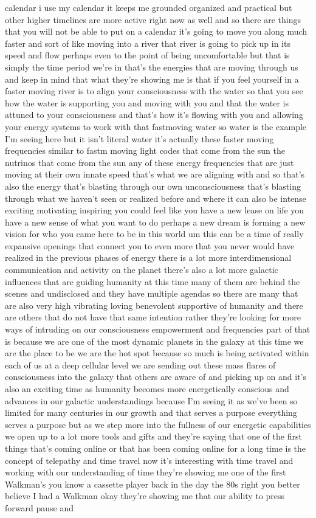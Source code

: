 \documentclass{article}
\begin{document}
calendar i use my calendar it keeps me grounded organized and practical but other higher timelines are more active right now as well and so there are things that you will not be able to put on a calendar it's going to move you along much faster and sort of like moving into a river that river is going to pick up in its speed and flow perhaps even to the point of being uncomfortable but that is simply the time period we're in that's the energies that are moving through us and keep in mind that what they're showing me is that if you feel yourself in a faster moving river is to align your consciousness with the water so that you see how the water is supporting you and moving with you and that the water is attuned to your consciousness and that's how it's flowing with you and allowing your energy systems to work with that fastmoving water so water is the example I'm seeing here but it isn't literal water it's actually these faster moving frequencies similar to fastm moving light codes that come from the sun the nutrinos that come from the sun any of these energy frequencies that are just moving at their own innate speed that's what we are aligning with and so that's also the energy that's blasting through our own unconsciousness that's blasting through what we haven't seen or realized before and where it can also be intense exciting motivating inspiring you could feel like you have a new lease on life you have a new sense of what you want to do perhaps a new dream is forming a new vision for who you came here to be in this world um this can be a time of really expansive openings that connect you to even more that you never would have realized in the previous phases of energy there is a lot more interdimensional communication and activity on the planet there's also a lot more galactic influences that are guiding humanity at this time many of them are behind the scenes and undisclosed and they have multiple agendas so there are many that are also very high vibrating loving benevolent supportive of humanity and there are others that do not have that same intention rather they're looking for more ways of intruding on our consciousness empowerment and frequencies part of that is because we are one of the most dynamic planets in the galaxy at this time we are the place to be we are the hot spot because so much is being activated within each of us at a deep cellular level we are sending out these mass flares of consciousness into the galaxy that others are aware of and picking up on and it's also an exciting time as humanity becomes more energetically conscious and advances in our galactic understandings because I'm seeing it as we've been so limited for many centuries in our growth and that serves a purpose everything serves a purpose but as we step more into the fullness of our energetic capabilities we open up to a lot more tools and gifts and they're saying that one of the first things that's coming online or that has been coming online for a long time is the concept of telepathy and time travel now it's interesting with time travel and working with our understanding of time they're showing me one of the first Walkman's you know a cassette player back in the day the 80s right you better believe I had a Walkman okay they're showing me that our ability to press forward pause and 
\end{document}
